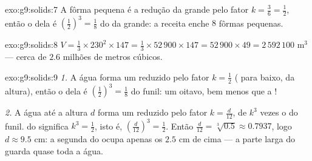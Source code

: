 \begin{solution}{exo:g9:solids:7}
A fôrma pequena é a redução da grande pelo fator
$k = \frac36 = \frac12$, então o  dela é
$\left(\frac12\right)^3 = \frac18$ do da grande: a receita enche $8$
fôrmas pequenas.
\end{solution}

\begin{solution}{exo:g9:solids:8}
$V = \frac13 \times 230^2 \times 147 = \frac13 \times 52\,900 \times
147 = 52\,900 \times 49 = 2\,592\,100$ m$^3$ --- cerca de $2.6$ milhões
de metros cúbicos.
\end{solution}

\begin{solution}{exo:g9:solids:9}
\emph{1.} A água forma um  reduzido pelo fator $k = \frac12$
( para baixo,  da altura), então o  dela é
$\left(\frac12\right)^3 = \frac18$ do funil: um oitavo, bem menos que a
!

\emph{2.} A água até a altura $d$ forma um  reduzido pelo fator
$k = \frac{d}{12}$, de  $k^3$ vezes o do funil.  do 
significa $k^3 = \frac12$, isto é,
$\left(\frac{d}{12}\right)^3 = \frac12$. Então
$\frac{d}{12} = \sqrt[3]{0.5} \approx 0.7937$, logo
$d \approx 9.5$ cm: a segunda  do  ocupa apenas os $2.5$ cm
de cima --- a parte larga do  guarda quase toda a água.
\end{solution}

